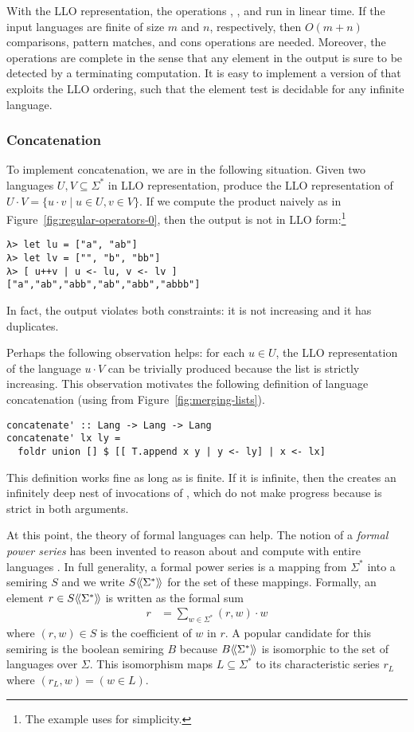 With the LLO representation, the operations ,
, and  run in linear time. If the input languages
are finite of size $m$ and $n$, respectively, then $O(m+n)$
comparisons, pattern matches, and cons operations are needed.
Moreover, the operations are complete in the sense that any element in
the output is sure to be detected by a terminating computation. 
It is easy to implement a version of  that exploits the LLO ordering,
such that the element test is decidable for any infinite
language.



\subsubsection{Concatenation}
To implement concatenation, we are in the following situation. Given
two languages $U, V \subseteq \Sigma^*$ in LLO representation,
produce the LLO representation of $U \cdot V =  \{ u\cdot v \mid u\in
U, v\in V\}$. If we compute the product naively as in
Figure~\ref{fig:regular-operators-0}, then the output is not in LLO
form:\footnote{The example uses  for simplicity.}
\begin{verbatim}
λ> let lu = ["a", "ab"]
λ> let lv = ["", "b", "bb"]
λ> [ u++v | u <- lu, v <- lv ]
["a","ab","abb","ab","abb","abbb"]
\end{verbatim}
In fact, the output violates both constraints: it is not increasing
and it has duplicates.

Perhaps the following observation helps: for each $u\in U$, the LLO
representation of the language $u\cdot V$ can be trivially produced
because the list \code{[ u++v | v <- lv ]} is strictly
increasing. This observation motivates the following definition of
language concatenation (using  from Figure~\ref{fig:merging-lists}).
\begin{lstlisting}
concatenate' :: Lang -> Lang -> Lang
concatenate' lx ly =
  foldr union [] $ [[ T.append x y | y <- ly] | x <- lx]
\end{lstlisting}
This definition works fine as long as  is finite. If it is
infinite, then the  creates an infinitely deep nest of
invocations of , which do not make progress because
 is strict in both arguments.

At this point, the theory of formal languages can help. The notion of
a \emph{formal power series} has been invented to reason about and
compute with entire languages \cite{DBLP:books/daglib/0067812,DBLP:books/sp/KuichS86}. In full
generality, a formal power series is a mapping from $\Sigma^*$ into a
semiring $S$ and we write $S\langle\!\langle\Sigma^*\rangle\!\rangle$ for the set of these
mappings. Formally, an element $r \in S\langle\!\langle\Sigma^*\rangle\!\rangle$ is written as the
formal sum
\begin{align*}
  r &= \sum_{w \in \Sigma^*} (r,w) \cdot w
\end{align*}
where $(r,w) \in S$ is the coefficient of $w$ in $r$.
A popular candidate for this semiring is the boolean semiring $B$
because $B\langle\!\langle\Sigma^*\rangle\!\rangle$ is isomorphic to the set of languages over
$\Sigma$. This isomorphism maps $L\subseteq\Sigma^*$ to its
characteristic series $r_L$ where $(r_L, w) = (w \in L)$.

